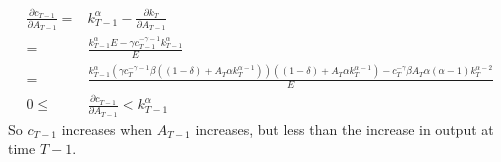 \documentclass[12pt,reqno]{amsart}
\theoremstyle{definition}
\begin{document}
\begin{align*}
  \frac{\partial c_{T-1}}{\partial A_{T-1}} = & k_{T-1}^\alpha -
\frac{\partial k_T}{\partial A_{T-1}} \\
= & \frac{k_{T-1}^\alpha E - \gamma c_{T-1}^{-\gamma-1}
  k_{T-1}^\alpha } {E} \\
= & \frac{k_{T-1}^\alpha \left(\gamma c_{T}^{-\gamma-1}
    \beta\left((1-\delta) + A_T 
      \alpha k_T^{\alpha-1}\right)\right)
  \left((1-\delta) + A_T\alpha k_T^{\alpha-1} \right) - c_T^{-\gamma}
  \beta A_T \alpha (\alpha-1) k_T^{\alpha-2} } {E} \\
0  \leq & \frac{\partial c_{T-1}}{\partial A_{T-1}} <  k_{T-1}^\alpha 
\end{align*}
So $c_{T-1}$ increases when $A_{T-1}$ increases, but less than the
increase in output at time $T-1$. 
\end{document}

